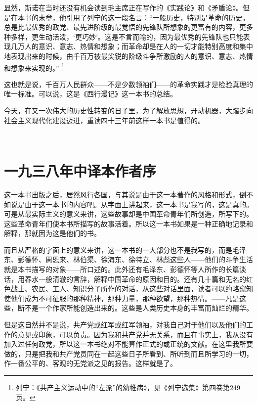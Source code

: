 \documentclass[10pt]{book}
\begin{document}
显然，斯诺在当时还没有机会读到毛主席正在写作的《实践论》和《矛盾论》。但是在本书的末章，他引用了列宁的这一段名言：“一般历史，特别是革命的历史，总是比最优秀的政党、最先进阶级的最觉悟的先锋队所想象的更富有的内容，更多种多样，更生动活泼，‘更巧妙’。这是不言而喻的，因为最优秀的先锋队也只能表现几万人的意识、意志、热情和想象；而革命却是在人的一切才能特别高度和集中地表现出来的时候，由千百万被最尖锐的阶级斗争所激励的人的意识、意志、热情和想象来实现的。”
\footnote{列宁：《共产主义运动中的“左派”的幼稚病》，见《列宁选集》第四卷第249页。}

这也就是说，千百万人民群众——不是少数领袖们——的革命实践才是检验真理的唯一标准。可以说，这是《西行漫记》这一本书的总结。

今天，在又一次伟大的历史性转变的日子里，为了解放思想，开动机器，大踏步向社会主义现代化建设迈进，重读四十三年前这样一本书是值得的。

~\\





\chapter*{一九三八年中译本作者序}


这一本书出版之后，居然风行各国，与其说是由于这一本著作的风格和形式，倒不如说是由于这一本书的内容吧。从字面上讲起来，这一本书是我写的，这是真的。可是从最实际主义的意义来讲，这些故事却是中国革命青年们所创造，所写下的。这些革命青年们使本书所描写的故事活着。所以这一本书如果是一种正确地记录和解释，那就因为这是他们的书。

而且从严格的字面上的意义来讲，这一本书的一大部分也不是我写的，而是毛泽东、彭德怀、周恩来、林伯渠、徐海东、徐特立、林彪这些人——他们的斗争生活就是本书描写的对象——所口述的。此外还有毛泽东、彭德怀等人所作的长篇谈话，用春水一般清澈的言辞，解释中国革命的原因和目的。还有几十篇和无名的红色战士、农民、工人、知识分子所作的对话，从这些对话里面，读者可以约略窥知使他们成为不可征服的那种精神，那种力量，那种欲望，那种热情。——凡是这些，断不是一个作家所能创造出来的。这些是人类历史本身的丰富而灿烂的精华。

但是这自然并不是说，共产党或红军或红军领袖，对我自己对于他们以及他们的工作的意见或印象，可以负责。因为我和共产党并无关系，而且在事实上，我从没有加入过任何政党，所以这一本书绝对不能算作正式的或正统的文献。在这里我所要做的，只是把我和共产党员同在一起这些日子所看到、所听到而且所学习的一切，作一番公平的、客观的无党派之见的报告。这样就是了。
\end{document}
